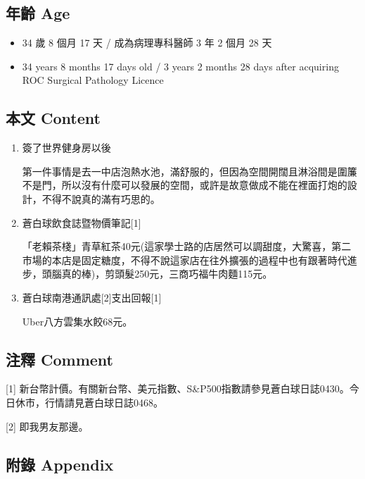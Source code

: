\documentclass[
]{article}
\providecommand{\tightlist}{%
  \setlength{\itemsep}{0pt}\setlength{\parskip}{0pt}}
\begin{document}
\hypertarget{ux5e74ux9f61-age-8}{%
\subsection{年齡 Age}\label{ux5e74ux9f61-age-8}}

\begin{itemize}
\tightlist
\item
  34 歲 8 個月 17 天 / 成為病理專科醫師 3 年 2 個月 28 天
\item
  34 years 8 months 17 days old / 3 years 2 months 28 days after
  acquiring ROC Surgical Pathology Licence
\end{itemize}

\hypertarget{ux672cux6587-content-8}{%
\subsection{本文 Content}\label{ux672cux6587-content-8}}

\begin{enumerate}
\def\labelenumi{\arabic{enumi}.}
\item
  簽了世界健身房以後

  第一件事情是去一中店泡熱水池，滿舒服的，但因為空間開闊且淋浴間是圍簾不是門，所以沒有什麼可以發展的空間，或許是故意做成不能在裡面打炮的設計，不得不說真的滿有巧思的。
\item
  蒼白球飲食誌暨物價筆記{[}1{]}

  「老賴茶棧」青草紅茶40元(這家學士路的店居然可以調甜度，大驚喜，第二市場的本店是固定糖度，不得不說這家店在往外擴張的過程中也有跟著時代進步，頭腦真的棒)，剪頭髮250元，三商巧福牛肉麵115元。
\item
  蒼白球南港通訊處{[}2{]}支出回報{[}1{]}

  Uber八方雲集水餃68元。
\end{enumerate}

\hypertarget{ux6ce8ux91cb-comment-8}{%
\subsection{注釋 Comment}\label{ux6ce8ux91cb-comment-8}}

{[}1{]}
新台幣計價。有關新台幣、美元指數、S\&P500指數請參見蒼白球日誌0430。今日休市，行情請見蒼白球日誌0468。

{[}2{]} 即我男友那邊。

\hypertarget{ux9644ux9304-appendix-8}{%
\subsection{附錄 Appendix}\label{ux9644ux9304-appendix-8}}
\end{document}
